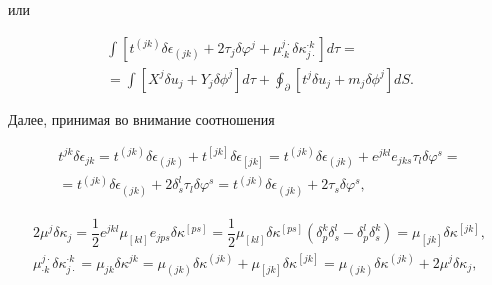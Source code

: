 или

\begin{multline}

\int\left[{t^{(jk)}\delta\epsilon_{(jk)}+2\tau_j\delta\varphi^j+\mu^{j\cdot}_{\cdot k}\delta\kappa_{j\cdot}^{\cdot k}}\right]d\tau=\\

%

=\int\left[{X^j\delta u_j+Y_j\delta\phi^j}\right]d\tau+\oint _\partial\left[{t^j\delta u_j+m_j\delta\phi^j}\right]dS.

\label{eq:principle-v-work-2}

\end{multline}



Далее, принимая во внимание соотношения

\begin{multline}

t^{jk}\delta\epsilon_{jk}=t^{(jk)}\delta\epsilon_{(jk)}+t^{[jk]}

\delta\epsilon_{[jk]}

=t^{(jk)}\delta\epsilon_{(jk)}+ e^{jkl}e_{jks}\tau_l\delta\varphi^s = 

\\

=t^{(jk)}\delta\epsilon_{(jk)}+2\delta^l_s\tau_l\delta\varphi^s

=t^{(jk)}\delta\epsilon_{(jk)}+2\tau_s\delta\varphi^s,

\end{multline}



\vspace{-5mm}



\begin{gather}

2\mu^j\delta\kappa_j=\dfrac{1}{2}e^{jkl}\mu_{[kl]}e_{jps}\delta\kappa^{[ps]} 

=\dfrac{1}{2}\mu_{[kl]}\delta\kappa^{[ps]}(\delta_p^k\delta_s^l-\delta_p^l\delta_s^k)

=\mu_{[jk]}\delta\kappa^{[jk]},

\\

\mu^{j\cdot}_{\cdot k}\delta\kappa_{j\cdot}^{\cdot k} =\mu_{jk}\delta\kappa^{jk}=\mu_{(jk)}\delta\kappa^{(jk)}+\mu_{[jk]}\delta\kappa^{[jk]}

=\mu_{(jk)}\delta\kappa^{(jk)}+2\mu^j\delta\kappa_j,

\end{gather}

